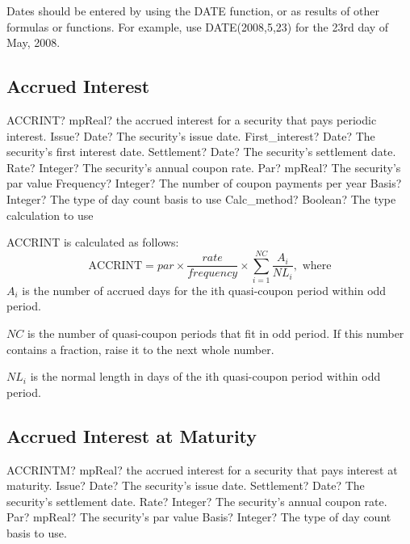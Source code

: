 \vspace{0.3cm}
Dates should be entered by using the DATE function, or as results of other formulas or functions. For example, use DATE(2008,5,23) for the 23rd day of May, 2008. 


\subsection{Accrued Interest}

\begin{mpFunctionsExtract}
	\mpWorksheetFunctionEightNotImplemented
	{ACCRINT? mpReal? the accrued interest for a security that pays periodic interest.}
	{Issue? Date? The security's issue date.}
	{First\_interest? Date? The security's first interest date.}
	{Settlement? Date?  The security's settlement date.}
	{Rate? Integer?  The security's annual coupon rate.}
	{Par? mpReal? The security's par value}
	{Frequency? Integer? The number of coupon payments per year}
	{Basis? Integer?  The type of day count basis to use}
	{Calc\_method? Boolean?  The type calculation to use}
\end{mpFunctionsExtract}

\vspace{0.3cm}
ACCRINT is calculated as follows: 
\begin{equation}
	\text{ACCRINT} = par \times \frac{rate}{frequency} \times \sum_{i=1}^{NC} \frac{A_i}{NL_i}, \text{ where}
\end{equation}
$A_i$ is the number of accrued days for the ith quasi-coupon period within odd period.

$NC$ is the number of quasi-coupon periods that fit in odd period. If this number contains a fraction, raise it to the next whole number.

$NL_i$ is the normal length in days of the ith quasi-coupon period within odd period.




\subsection{Accrued Interest at Maturity}

\begin{mpFunctionsExtract}
	\mpWorksheetFunctionFiveNotImplemented
	{ACCRINTM? mpReal? the accrued interest for a security that pays interest at maturity.}
	{Issue? Date? The security's issue date.}
	{Settlement? Date?  The security's settlement date.}
	{Rate? Integer?  The security's annual coupon rate.}
	{Par? mpReal? The security's par value}
	{Basis? Integer? The type of day count basis to use.}
\end{mpFunctionsExtract}

